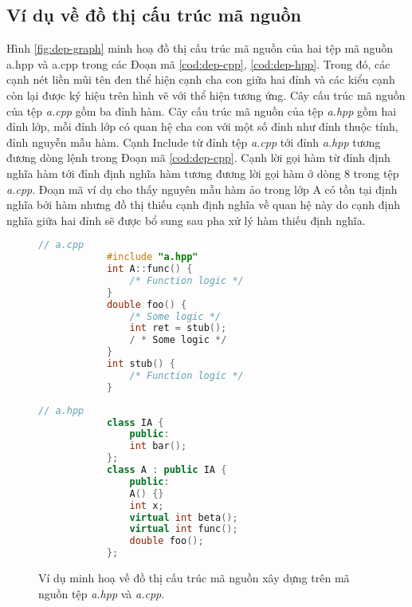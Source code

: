 \subsection*{Ví dụ về đồ thị cấu trúc mã nguồn}
Hình \autoref{fig:dep-graph} minh hoạ đồ thị cấu trúc mã nguồn của hai tệp mã nguồn a.hpp và a.cpp trong các Đoạn mã \autoref{cod:dep-cpp}, \autoref{cod:dep-hpp}. Trong đó, các cạnh nét liền mũi tên đen thể hiện cạnh cha con giữa hai đỉnh và các kiểu cạnh còn lại được ký hiệu trên hình vẽ với thể hiện tương ứng. Cây cấu trúc mã nguồn của tệp \textit{a.cpp} gồm ba đỉnh hàm. Cây cấu trúc mã nguồn của tệp \textit{a.hpp} gồm hai đỉnh lớp, mỗi đỉnh lớp có quan hệ cha con với một số đỉnh như đỉnh thuộc tính, đỉnh nguyễn mẫu hàm. Cạnh Include từ đỉnh tệp \textit{a.cpp} tới đỉnh \textit{a.hpp} tương đương dòng lệnh  trong Đoạn mã \autoref{cod:dep-cpp}. Cạnh lời gọi hàm từ đỉnh định nghĩa hàm  tới đỉnh định nghĩa hàm  tương đương lời gọi hàm ở dòng 8 trong tệp \textit{a.cpp}. Đoạn mã ví dụ cho thấy nguyên mẫu hàm ảo  trong lớp A có tồn tại định nghĩa bởi hàm  nhưng đồ thị thiếu cạnh định nghĩa về quan hệ này do cạnh định nghĩa giữa hai đỉnh sẽ được bổ sung sau pha xử lý hàm thiếu định nghĩa.  

\begin{figure}[H]
	\begin{minipage}[t]{0.49\linewidth}
		\begin{lstlisting}[language=C++, caption={Mã nguồn tệp \textit{a.cpp} minh họa đồ thị cấu trúc mã nguồn.}, label={cod:dep-cpp}, captionpos=b]
			// a.cpp
			#include "a.hpp"
			int A::func() {
				/* Function logic */
			}
			double foo() {
				/* Some logic */
				int ret = stub();
				/ * Some logic */
			}
			int stub() {
				/* Function logic */
			}
		\end{lstlisting}
	\end{minipage}
	\begin{minipage}[t]{0.49\linewidth}
		\begin{lstlisting}[language=C++, caption={Mã nguồn tệp \textit{a.hpp} minh họa đồ thị cấu trúc mã nguồn.}, label={cod:dep-hpp}, captionpos=b]
			// a.hpp
			class IA {
				public: 
				int bar();
			};
			class A : public IA {
				public:
				A() {}
				int x;
				virtual int beta();
				virtual int func();
				double foo();
			}; 
		\end{lstlisting}
	\end{minipage}
			
	\vspace{1cm}
    
    \caption{Ví dụ minh hoạ về đồ thị cấu trúc mã nguồn xây dựng trên mã nguồn tệp \textit{a.hpp} và \textit{a.cpp}.}
    \label{fig:dep-graph}
\end{figure}

